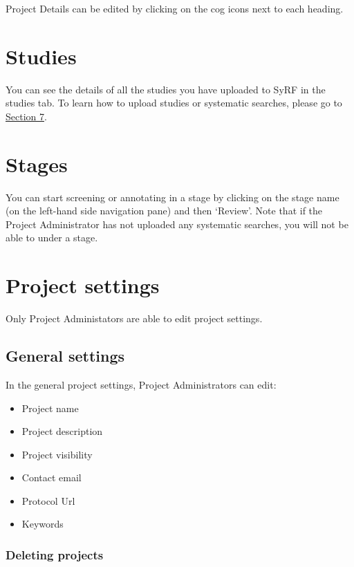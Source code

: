 \documentclass[
]{book}
\providecommand{\tightlist}{%
  \setlength{\itemsep}{0pt}\setlength{\parskip}{0pt}}
\begin{document}
Project Details can be edited by clicking on the cog icons next to each heading.

\hypertarget{studies}{%
\section{Studies}\label{studies}}

You can see the details of all the studies you have uploaded to SyRF in the studies tab. To learn how to upload studies or systematic searches, please go to \href{https://camaradesuk.github.io/syrf_userguide/systematicSearch.html}{Section 7}.

\hypertarget{stages}{%
\section{Stages}\label{stages}}

You can start screening or annotating in a stage by clicking on the stage name (on the left-hand side navigation pane) and then `Review'. Note that if the Project Administrator has not uploaded any systematic searches, you will not be able to under a stage.

\hypertarget{project-settings}{%
\section{Project settings}\label{project-settings}}

Only Project Administators are able to edit project settings.

\hypertarget{general-settings}{%
\subsection{General settings}\label{general-settings}}

In the general project settings, Project Administrators can edit:

\begin{itemize}
\tightlist
\item
  Project name
\item
  Project description
\item
  Project visibility
\item
  Contact email
\item
  Protocol Url
\item
  Keywords
\end{itemize}

\hypertarget{deleting-projects}{%
\subsubsection{Deleting projects}\label{deleting-projects}}
\end{document}
